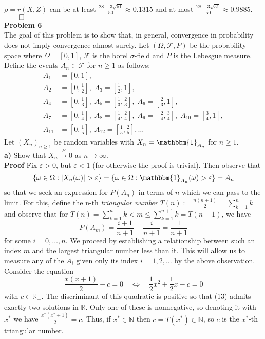 \documentclass[10pt]{article}
\newcommand{\mbb}[1]{\mathbb{#1}}
\newcommand{\1}[1]{\mathbbm{1}_{#1}}
\begin{document}
    $\rho=r(X,Z)$ can be at least $\frac{28-3\sqrt{51}}{50}\approx 0.1315$ and at most $\frac{28+3\sqrt{51}}{50}\approx 0.9885$.\hfill{$\qed$}\\[5pt]
    {\bf Problem 6}\\[5pt]
    The goal of this problem is to show that, in general, convergence in probability does not imply convergence almost surely. Let $(\Omega, \mathcal{F}, P)$ be the probability space where $\Omega=[0,1]$,
    $\mathcal{F}$ is the borel $\sigma$-field and $P$ is the Lebesgue measure. Define the events $A_n\in\mathcal{F}$ for $n\geq  1$ as follows:
    \begin{align*}
        A_1&=[0,1],\\
        A_2&=[0,\tfrac{1}{2}],\;A_3=[\tfrac{1}{2},1],\\
        A_4&=[0,\tfrac{1}{3}],\;A_5=[\tfrac{1}{3},\tfrac{2}{3}],\;A_6=[\tfrac{2}{3},1],\\
        A_7&=[0,\tfrac{1}{4}],\;A_8=[\tfrac{1}{4},\tfrac{2}{4}],\;A_9=[\tfrac{2}{4},\tfrac{3}{4}],\;A_{10}=[\tfrac{3}{4},1],\\
        A_{11}&=[0,\tfrac{1}{5}],\;A_{12}=[\tfrac{1}{5},\tfrac{2}{5}],\dots
    \end{align*}
    Let $(X_n)_{n\geq 1}$ be random variables with $X_n=\1{A_n}$ for $n\geq 1$.\\[5pt]
    {\bf a)} Show that $X_n\overset{P}{\longrightarrow} 0$ as $n\rightarrow\infty$.\\[5pt]
    {\bf Proof}\hspace{5pt} Fix $\varepsilon>0$, but $\varepsilon<1$ (for otherwise the proof is trivial). Then observe that
    \[\{\omega\in\Omega:|X_n(\omega)|>\varepsilon\}=\{\omega\in\Omega:\1{A_n}(\omega)>\varepsilon\}=A_n\]
    so that we seek an expression for $P(A_n)$ in terms of $n$ which we can pass to the limit. For this, define the n-th {\it triangular number} $T(n):=\frac{n(n+1)}{2}=\sum_{k=1}^nk$ and observe that for $T(n)=\sum_{k=1}^nk< m\leq \sum_{k=1}^{n+1}k=T(n+1)$, we have
    \[P(A_m)=\frac{i+1}{n+1}-\frac{i}{n+1}=\frac{1}{n+1}\]
    for some $i=0,\dots,n$. We proceed by establishing a relationship between such an index $m$ and the largest triangular number less than it. This will allow us to measure any of the $A_i$ given only its index $i=1,2,\dots$ by the above observation.\\[5pt]
    Consider the equation
    \[\frac{x(x+1)}{2}-c=0\quad\Leftrightarrow\quad \frac{1}{2}x^2+\frac{1}{2}x-c=0\tag{13}\]
    with $c\in\mbb{R}_+$. The discriminant of this quadratic is positive so that (13) admits exactly two solutions in $\mbb{R}$. Only one of these is nonnegative, so denoting it with $x^\ast$ we have $\frac{x^\ast(x^\ast+1)}{2}=c$. Thus, if $x^\ast\in\mbb{N}$ then $c=T(x^\ast)\in\mbb{N}$, so $c$ is the $x^\ast$-th triangular number.
\end{document}
